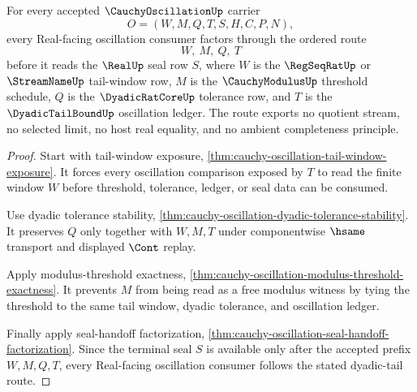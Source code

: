 \begin{theorem}
\label{thm:cauchy-oscillation-dyadic-tail-real-seal-route}
For every accepted $\CauchyOscillationUp$ carrier
$$
O=(W,M,Q,T,S,H,C,P,N),
$$
every Real-facing oscillation consumer factors through the ordered route
$$
W,\ M,\ Q,\ T
$$
before it reads the $\RealUp$ seal row $S$, where $W$ is the $\RegSeqRatUp$ or $\StreamNameUp$ tail-window row, $M$ is the $\CauchyModulusUp$ threshold schedule, $Q$ is the $\DyadicRatCoreUp$ tolerance row, and $T$ is the $\DyadicTailBoundUp$ oscillation ledger. The route exports no quotient stream, no selected limit, no host real equality, and no ambient completeness principle.
\end{theorem}
\begin{proof}
Start with tail-window exposure, \autoref{thm:cauchy-oscillation-tail-window-exposure}. It forces every oscillation comparison exposed by $T$ to read the finite window $W$ before threshold, tolerance, ledger, or seal data can be consumed.

Use dyadic tolerance stability, \autoref{thm:cauchy-oscillation-dyadic-tolerance-stability}. It preserves $Q$ only together with $W,M,T$ under componentwise $\hsame$ transport and displayed $\Cont$ replay.

Apply modulus-threshold exactness, \autoref{thm:cauchy-oscillation-modulus-threshold-exactness}. It prevents $M$ from being read as a free modulus witness by tying the threshold to the same tail window, dyadic tolerance, and oscillation ledger.

Finally apply seal-handoff factorization, \autoref{thm:cauchy-oscillation-seal-handoff-factorization}. Since the terminal seal $S$ is available only after the accepted prefix $W,M,Q,T$, every Real-facing oscillation consumer follows the stated dyadic-tail route.
\end{proof}

